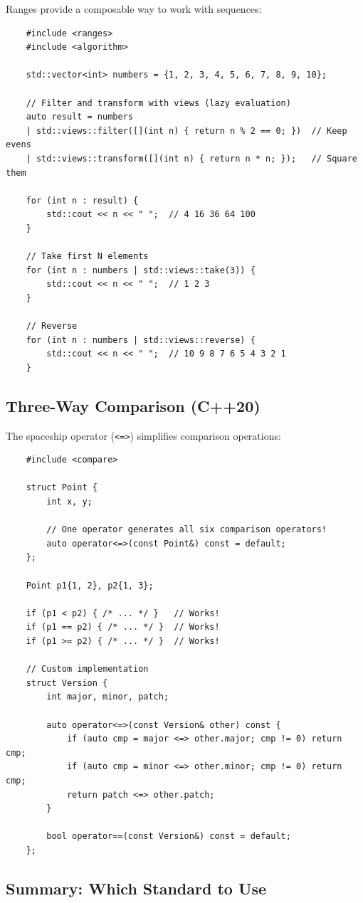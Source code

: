 Ranges provide a composable way to work with sequences:

\begin{lstlisting}
	#include <ranges>
	#include <algorithm>
	
	std::vector<int> numbers = {1, 2, 3, 4, 5, 6, 7, 8, 9, 10};
	
	// Filter and transform with views (lazy evaluation)
	auto result = numbers 
	| std::views::filter([](int n) { return n % 2 == 0; })  // Keep evens
	| std::views::transform([](int n) { return n * n; });   // Square them
	
	for (int n : result) {
		std::cout << n << " ";  // 4 16 36 64 100
	}
	
	// Take first N elements
	for (int n : numbers | std::views::take(3)) {
		std::cout << n << " ";  // 1 2 3
	}
	
	// Reverse
	for (int n : numbers | std::views::reverse) {
		std::cout << n << " ";  // 10 9 8 7 6 5 4 3 2 1
	}
\end{lstlisting}

\subsection{Three-Way Comparison (C++20)}

The spaceship operator (\texttt{<=>}) simplifies comparison operations:

\begin{lstlisting}
	#include <compare>
	
	struct Point {
		int x, y;
		
		// One operator generates all six comparison operators!
		auto operator<=>(const Point&) const = default;
	};
	
	Point p1{1, 2}, p2{1, 3};
	
	if (p1 < p2) { /* ... */ }   // Works!
	if (p1 == p2) { /* ... */ }  // Works!
	if (p1 >= p2) { /* ... */ }  // Works!
	
	// Custom implementation
	struct Version {
		int major, minor, patch;
		
		auto operator<=>(const Version& other) const {
			if (auto cmp = major <=> other.major; cmp != 0) return cmp;
			if (auto cmp = minor <=> other.minor; cmp != 0) return cmp;
			return patch <=> other.patch;
		}
		
		bool operator==(const Version&) const = default;
	};
\end{lstlisting}

\subsection{Summary: Which Standard to Use}

